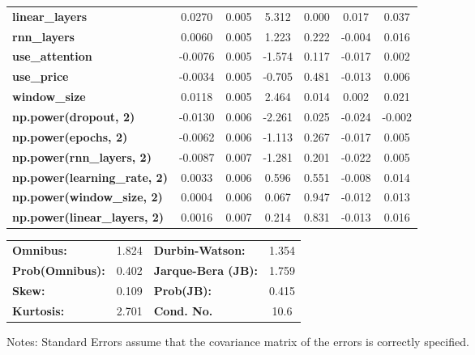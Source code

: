 \begin{center}
\begin{tabular}{lcccccc}
\textbf{linear\_layers}              &       0.0270  &        0.005     &     5.312  &         0.000        &        0.017    &        0.037     \\
\textbf{rnn\_layers}                 &       0.0060  &        0.005     &     1.223  &         0.222        &       -0.004    &        0.016     \\
\textbf{use\_attention}              &      -0.0076  &        0.005     &    -1.574  &         0.117        &       -0.017    &        0.002     \\
\textbf{use\_price}                  &      -0.0034  &        0.005     &    -0.705  &         0.481        &       -0.013    &        0.006     \\
\textbf{window\_size}                &       0.0118  &        0.005     &     2.464  &         0.014        &        0.002    &        0.021     \\
\textbf{np.power(dropout, 2)}        &      -0.0130  &        0.006     &    -2.261  &         0.025        &       -0.024    &       -0.002     \\
\textbf{np.power(epochs, 2)}         &      -0.0062  &        0.006     &    -1.113  &         0.267        &       -0.017    &        0.005     \\
\textbf{np.power(rnn\_layers, 2)}    &      -0.0087  &        0.007     &    -1.281  &         0.201        &       -0.022    &        0.005     \\
\textbf{np.power(learning\_rate, 2)} &       0.0033  &        0.006     &     0.596  &         0.551        &       -0.008    &        0.014     \\
\textbf{np.power(window\_size, 2)}   &       0.0004  &        0.006     &     0.067  &         0.947        &       -0.012    &        0.013     \\
\textbf{np.power(linear\_layers, 2)} &       0.0016  &        0.007     &     0.214  &         0.831        &       -0.013    &        0.016     \\
\bottomrule
\end{tabular}
\begin{tabular}{lclc}
\textbf{Omnibus:}       &  1.824 & \textbf{  Durbin-Watson:     } &    1.354  \\
\textbf{Prob(Omnibus):} &  0.402 & \textbf{  Jarque-Bera (JB):  } &    1.759  \\
\textbf{Skew:}          &  0.109 & \textbf{  Prob(JB):          } &    0.415  \\
\textbf{Kurtosis:}      &  2.701 & \textbf{  Cond. No.          } &     10.6  \\
\bottomrule
\end{tabular}
\end{center}

Notes: \newline
 [1] Standard Errors assume that the covariance matrix of the errors is correctly specified.